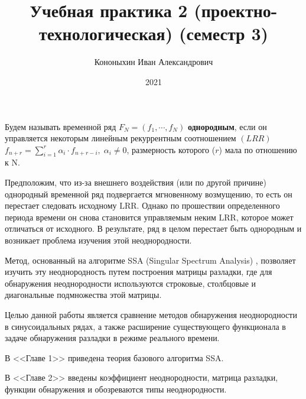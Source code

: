 \documentclass[specialist, substylefile = spbu.rtx,
			   subf, href, 12pt]{disser}
\begin{document}

\title{Учебная практика 2 (проектно-технологическая) (семестр 3)}


\author{Кононыхин Иван Александрович}


\date{2021}

\maketitle



\newpage
\tableofcontents
\newpage

\intro
Будем называть временной ряд $F_N = (f_1, \cdots, f_{N})$ \textbf{однородным}, если он управляется некоторым линейным рекуррентным соотношением $(LRR)$ $f_{n+r} = \sum_{i=1}^{r} \alpha_i\cdot f_{n+r-i}, \; \alpha_i \neq 0$, размерность которого ($r$) мала по отношению к $\mathrm{N}$. 

Предположим, что из-за внешнего воздействия (или по другой причине) однородный временной ряд подвергается мгновенному возмущению, то есть он перестает следовать исходному $\mathrm{LRR}$. Однако по прошествии определенного периода времени он снова становится управляемым неким $\mathrm{LRR}$, которое может отличаться от исходного. В результате, ряд в целом перестает быть однородным и возникает проблема изучения этой неоднородности.

Метод, основанный на алгоритме SSA (Singular Spectrum Analysis) \cite{TSStructure}, позволяет изучить эту неоднородность путем построения матрицы разладки, где для обнаружения неоднородности используются строковые, столбцовые и диагональные подмножества этой матрицы.

Целью данной работы является сравнение методов обнаружения неоднородности в синусоидальных рядах, а также расширение существующего функционала в задаче обнаружения разладки в режиме реального времени.

В <<Главе 1>> приведена теория базового алгоритма SSA.

В <<Главе 2>> введены коэффициент неоднородности, матрица разладки, функции обнаружения и обозреваются типы неоднородности.
\end{document}
